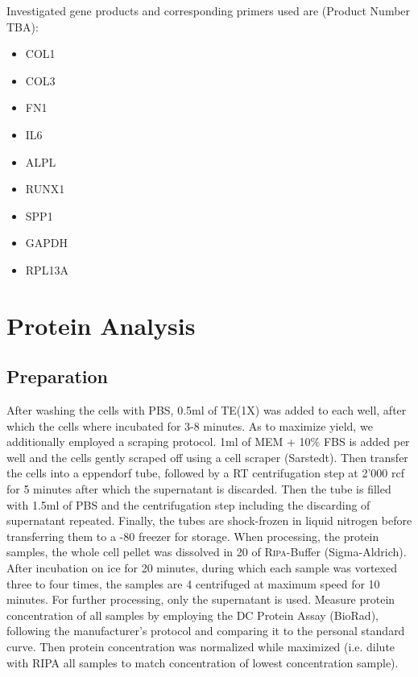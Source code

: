 Investigated gene products and corresponding primers used are (Product Number TBA): 
\begin{itemize}
\item COL1
\item COL3
\item FN1
\item IL6
\item ALPL
\item RUNX1
\item SPP1
\item GAPDH 
\item RPL13A
\end{itemize}

\section{Protein Analysis}
\subsection{Preparation}
After washing the cells with PBS, 0.5ml of TE(1X) was added to each well, after which the cells where incubated for 3-8 minutes. As to maximize yield, we additionally employed a scraping protocol. 1ml of MEM\textalpha{} + 10\% FBS is added per well and the cells gently scraped off using a cell scraper (Sarstedt). Then transfer the cells into a eppendorf tube, followed by a RT centrifugation step at 2'000 rcf for 5 minutes after which the supernatant is discarded. Then the tube is filled with 1.5ml of PBS and the centrifugation step including the discarding of supernatant repeated. Finally, the tubes are shock-frozen in liquid nitrogen before transferring them to a -80 \degC freezer for storage. When processing, the protein samples, the whole cell pellet was dissolved in 20\mul{} of \textsc{Ripa}-Buffer (Sigma-Aldrich). After incubation on ice for 20 minutes, during which each sample was vortexed three to four times, the samples are 4 \degC centrifuged at maximum speed for 10 minutes. For further processing, only the supernatant is used. Measure protein concentration of all samples by employing the DC\texttrademark{} Protein Assay (BioRad), following the manufacturer's protocol and comparing it to the personal standard curve. Then protein concentration was normalized while maximized (i.e. dilute with RIPA all samples to match concentration of lowest concentration sample). 

